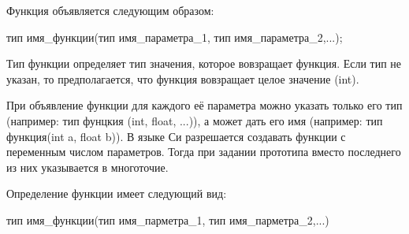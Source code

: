 \documentclass[a4paper, fontsize=10bp]{article} %
\begin{document}
\noindent Функция объявляется следующим образом:

тип имя\_функции(тип имя\_параметра\_1, тип имя\_параметра\_2,...);

\noindent Тип функции определяет тип значения, которое вовзращает функция. Если тип не указан, то предполагается,
что функция вовзращает целое значение (int).

\noindent При объявление функции для каждого её параметра можно указать только его тип (например: тип фунцкия 
(int, float, ...)), а может дать его имя (например: тип функция(int a, float b)).
В языке Си разрешается создавать функции с переменным числом параметров. Тогда при задании прототипа
вместо последнего из них указывается в многоточие.

\noindent  Определение функции имеет следующий вид:

тип имя\_функции(тип имя\_парметра\_1, тип имя\_парметра\_2,...)
\end{document}
